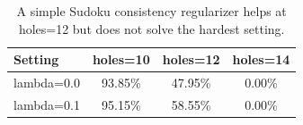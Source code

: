 \begin{table}[t]
\centering
\small
\caption{A simple Sudoku consistency regularizer helps at holes=12 but does not solve the hardest setting.}
\label{tab:appendix-sudoku-consistency}
\begin{tabular}{lccc}
\toprule
Setting & holes=10 & holes=12 & holes=14 \\
\midrule
lambda=0.0 & 93.85\% & 47.95\% & 0.00\% \\
lambda=0.1 & 95.15\% & 58.55\% & 0.00\% \\
\bottomrule
\end{tabular}
\end{table}
